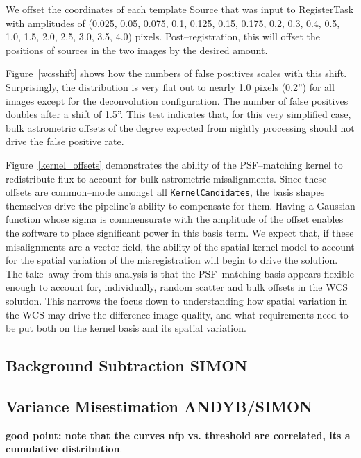 \documentclass[prd, nofootinbib, floatfix, 11pt,tightenlines,times]{article}
\begin{document}
We offset the coordinates of each template Source that was input to
RegisterTask with amplitudes of (0.025, 0.05, 0.075, 0.1, 0.125, 0.15,
0.175, 0.2, 0.3, 0.4, 0.5, 1.0, 1.5, 2.0, 2.5, 3.0, 3.5, 4.0) pixels.
Post--registration, this will offset the positions of sources in the
two images by the desired amount.

Figure~\ref{wcsshift} shows how the numbers of false positives scales
with this shift.  Surprisingly, the distribution is very flat out to
nearly 1.0 pixels (0.2'') for all images except for the deconvolution
configuration.  The number of false positives doubles after a shift of
1.5''.  This test indicates that, for this very simplified case, bulk
astrometric offsets of the degree expected from nightly processing
should not drive the false positive rate.  

Figure~\ref{kernel_offsets} demonstrates the ability of the
PSF--matching kernel to redistribute flux to account for bulk
astrometric misalignments.  Since these offsets are common--mode
amongst all {\tt KernelCandidates}, the basis shapes themselves drive
the pipeline's ability to compensate for them.  Having a Gaussian
function whose sigma is commensurate with the amplitude of the offset
enables the software to place significant power in this basis term.  We
expect that, if these misalignments are a vector field, the ability of
the spatial kernel model to account for the spatial variation of the
misregistration will begin to drive the solution.  The take--away
from this analysis is that the PSF--matching basis appears flexible
enough to account for, individually, random scatter and bulk offsets
in the WCS solution.  This narrows the focus down to understanding how
spatial variation in the WCS may drive the difference image quality,
and what requirements need to be put both on the kernel basis and its
spatial variation.


\subsection{Background Subtraction {\bf SIMON} \label{sec-bg}}



\subsection{Variance Misestimation {\bf ANDYB/SIMON}}

{\bf good point: note that the curves nfp vs. threshold are
  correlated, its a cumulative distribution}.
\end{document}
